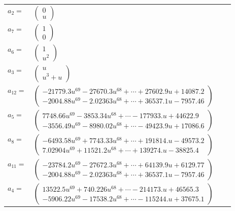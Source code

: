 \documentclass[1p]{elsarticle_modified}
\theoremstyle{definition}
\begin{document}
\begin{tabular}{m{7pt} m{180pt} m{7pt} m{180pt} }
\flushright $a_{2}=$&$\begin{pmatrix}0\\u\end{pmatrix}$ \\
\flushright $a_{7}=$&$\begin{pmatrix}1\\0\end{pmatrix}$ \\
\flushright $a_{6}=$&$\begin{pmatrix}1\\u^2\end{pmatrix}$ \\
\flushright $a_{3}=$&$\begin{pmatrix}u\\u^3+u\end{pmatrix}$ \\
\flushright $a_{12}=$&$\begin{pmatrix}-21779.3 u^{69}-27670.3 u^{68}+\cdots+27602.9 u+14087.2\\-2004.88 u^{69}-2.02363 u^{68}+\cdots+36537.1 u-7957.46\end{pmatrix}$ \\
\flushright $a_{5}=$&$\begin{pmatrix}7748.66 u^{69}-3853.34 u^{68}+\cdots-177933. u+44622.9\\-3556.49 u^{69}-8980.02 u^{68}+\cdots-49423.9 u+17086.6\end{pmatrix}$ \\
\flushright $a_{8}=$&$\begin{pmatrix}-6493.58 u^{69}+7743.33 u^{68}+\cdots+191814. u-49573.2\\7.02904 u^{69}+11521.2 u^{68}+\cdots+139274. u-38825.4\end{pmatrix}$ \\
\flushright $a_{11}=$&$\begin{pmatrix}-23784.2 u^{69}-27672.3 u^{68}+\cdots+64139.9 u+6129.77\\-2004.88 u^{69}-2.02363 u^{68}+\cdots+36537.1 u-7957.46\end{pmatrix}$ \\
\flushright $a_{4}=$&$\begin{pmatrix}13522.5 u^{69}+740.226 u^{68}+\cdots-214173. u+46565.3\\-5906.22 u^{69}-17538.2 u^{68}+\cdots-115244. u+37675.1\end{pmatrix}$ \\

\end{tabular}
\end{document}
